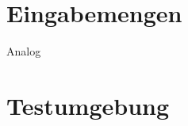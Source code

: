 \section{Eingabemengen}
\label{sec:runtime-inputs}

Analog 

\section{Testumgebung}
\label{sec:runtime-environment}


